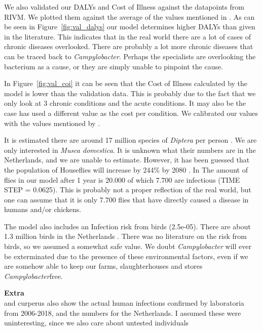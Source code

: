 We also validated our DALYs and Cost of Illness against the datapoints from RIVM. We plotted them against the average of the values mentioned in . As can be seen in Figure~\ref{fig:val_dalys} our model determines higher DALYs than given in the literature. This indicates that in the real world there are a lot of cases of chronic diseases overlooked. There are probably a lot more chronic diseases that can be traced back to \textit{Campylobacter}. Perhaps the specialists are overlooking the bacterium as a cause, or they are simply unable to pinpoint the cause.

In Figure~\ref{fig:val_coi} it can be seen that the Cost of Illness calculated by the model is lower than the validation data. This is probably due to the fact that we only look at 3 chronic conditions and the acute conditions. It may also be the case \citeauthor{vlaanderen_staat_2019} has used a different value as the cost per condition. We calibrated our values with the values mentioned by \textcite{mangen_campylobacteriosis_2007}.

It is estimated there are around 17 million species of \textit{Diptera} per person \parencite{gorman_trillions_2017}. We are only interested in \textit{Musca domestica}. It is unknown what their numbers are in the Netherlands, and we are unable to estimate. However, it has been guessed that the population of Houseflies will increase by 244\% by 2080 \parencite{mcalister_secret_2017}. In The amount of flies in our model after 1 year is 20.000 of which 7.700 are infectious (TIME STEP = 0.0625). This is probably not a proper reflection of the real world, but one can assume that it is only 7.700 flies that have directly caused a disease in humans and/or chickens.

The model also includes an Infection risk from birds (2.5e-05). There are about 1.3 million birds in the Netherlands \parencite{noauthor_miljoenen_2019}. There was no literature on the risk from birds, so we assumed a somewhat safe value. We doubt \textit{Campylobacter} will ever be exterminated due to the presence of these environmental factors, even if we are somehow able to keep our farms, slaughterhouses and stores \textit{Campylobacter}free.


\iffalse
\textbf{Extra}\\
\textcite{vlaanderen_staat_2019} and curperus also show the actual human infections confirmed by laboratoria from 2006-2018, and the numbers for the Netherlands. I assumed these were uninteresting, since we also care about untested individuals

